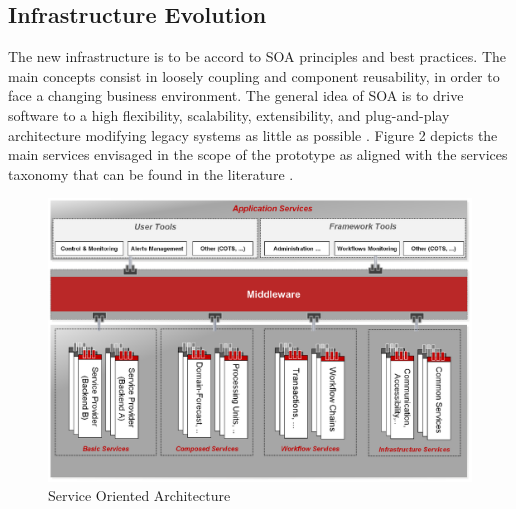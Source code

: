 \subsection{Infrastructure Evolution}
The new infrastructure is to be accord to SOA principles and best practices. The main concepts consist in loosely coupling and component reusability, in order to face a changing business environment. The general idea of SOA is to drive software to a high flexibility, scalability, extensibility, and plug-and-play architecture modifying legacy systems as little as possible \citep{soa1}. Figure 2 depicts the main services envisaged in the scope of the prototype as aligned with the services taxonomy that can be found in the literature \citep{soa2}.
\begin{figure}[ht]
\centering
\includegraphics[width=80 mm]{part10/Perez_P022/P022_f2.eps}
\caption{Service Oriented Architecture}
\end{figure}
